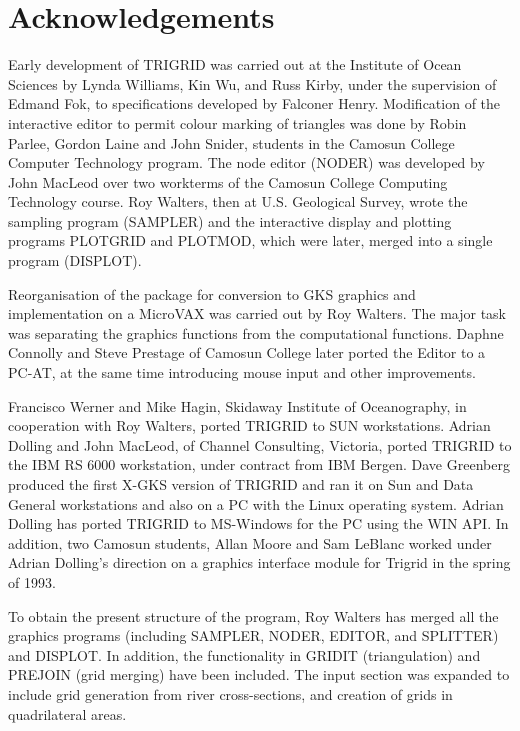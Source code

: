 \documentclass{article}
\begin{document}
\newpage
{}
\section*{Acknowledgements}

Early development of TRIGRID was carried out at the Institute of Ocean Sciences by Lynda
Williams, Kin Wu, and Russ Kirby, under the supervision of Edmand Fok, to specifications
developed by Falconer Henry. Modification of the interactive editor to permit colour marking of
triangles was done by Robin Parlee, Gordon Laine and John Snider, students in the Camosun College
Computer Technology program. The node editor (NODER) was developed by John MacLeod over
two workterms of the Camosun College Computing Technology course. Roy Walters, then at U.S.
Geological Survey, wrote the sampling program (SAMPLER) and the interactive display and plotting
programs PLOTGRID and PLOTMOD, which were later, merged into a single program (DISPLOT).

Reorganisation of the package for conversion to GKS graphics and implementation on a MicroVAX
was carried out by Roy Walters. The major task was separating the graphics functions from the 
computational functions. Daphne Connolly and Steve Prestage of Camosun College later
ported the Editor to a PC-AT, at the same time introducing mouse input and other improvements.

Francisco Werner and Mike Hagin, Skidaway Institute of Oceanography, in cooperation with Roy
Walters, ported TRIGRID to SUN workstations. Adrian Dolling and John MacLeod, of Channel
Consulting, Victoria, ported TRIGRID to the IBM RS 6000 workstation, under contract from IBM
Bergen. Dave Greenberg produced the first X-GKS version of TRIGRID and ran it on Sun and Data
General workstations and also on a PC with the Linux operating system. Adrian Dolling 
has ported TRIGRID to MS-Windows for the PC using the WIN API.
In addition, two Camosun students, Allan Moore and Sam LeBlanc worked under Adrian Dolling’s 
direction on a graphics interface module for Trigrid in the spring of 1993.

To obtain the present structure of the program, Roy Walters has merged all the graphics programs
(including SAMPLER, NODER, EDITOR, and SPLITTER) and DISPLOT. In addition, the
functionality in GRIDIT (triangulation) and PREJOIN (grid merging) have been included. The input
section was expanded to include grid generation from river cross-sections, and creation of grids in
quadrilateral areas.
\end{document}
